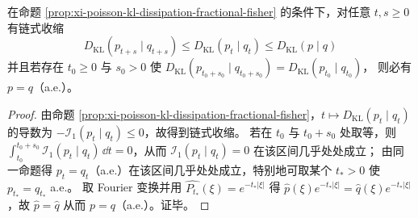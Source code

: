 \begin{corollary}\label{cor:xi-poisson-kl-contraction-rigidity}
在命题 \ref{prop:xi-poisson-kl-dissipation-fractional-fisher} 的条件下，对任意 \(t,s\ge 0\) 有链式收缩
\[
\boxed{\;
D_{\mathrm{KL}}(p_{t+s}\mid q_{t+s})\le D_{\mathrm{KL}}(p_t\mid q_t)\le D_{\mathrm{KL}}(p\mid q)\;}
\]
并且若存在 \(t_0\ge 0\) 与 \(s_0>0\) 使
\(
D_{\mathrm{KL}}(p_{t_0+s_0}\mid q_{t_0+s_0})=D_{\mathrm{KL}}(p_{t_0}\mid q_{t_0})
\)，
则必有 \(p=q\)（a.e.）。
\end{corollary}
\begin{proof}
由命题 \ref{prop:xi-poisson-kl-dissipation-fractional-fisher}，\(t\mapsto D_{\mathrm{KL}}(p_t\mid q_t)\) 的导数为 \(-\mathcal I_1(p_t\mid q_t)\le 0\)，故得到链式收缩。
若在 \(t_0\) 与 \(t_0+s_0\) 处取等，则 \(\int_{t_0}^{t_0+s_0}\mathcal I_1(p_t\mid q_t)\,\dd t=0\)，从而 \(\mathcal I_1(p_t\mid q_t)=0\) 在该区间几乎处处成立；
由同一命题得 \(p_t=q_t\)（a.e.）在该区间几乎处处成立，特别地可取某个 \(t_\ast>0\) 使 \(p_{t_\ast}=q_{t_\ast}\) a.e.。
取 Fourier 变换并用 \(\widehat{P_{t_\ast}}(\xi)=e^{-t_\ast|\xi|}\) 得 \(\widehat p(\xi)e^{-t_\ast|\xi|}=\widehat q(\xi)e^{-t_\ast|\xi|}\)，故 \(\widehat p=\widehat q\) 从而 \(p=q\)（a.e.）。证毕。
\end{proof}

